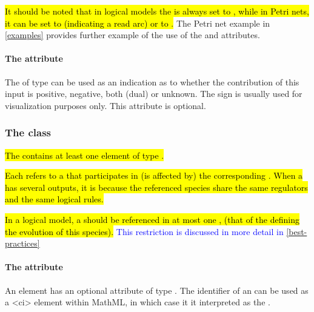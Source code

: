 \hl{It should be noted that in logical models the  is always set to , while in Petri nets, it can be set to  (indicating a read arc) or to . } The Petri net example in \ref{examples} provides further example of the use of the  and  attributes. 


 
\paragraph{The  attribute}
The  of type  can be used as an indication as to whether the contribution of this input is positive, negative, both (dual) or unknown. The sign is usually used for visualization purposes only. This attribute is optional.


\subsubsection{The  class}
\label{output-class}

\hl{The \ListOfOutputs contains at least one element of type \Output. }

\hl{Each \Output refers to a \QualitativeSpecies that participates in (is affected by) the corresponding \Transition. When a \Transition has several outputs, it is because the referenced species share the same regulators and the same logical rules.}


\hl{In a logical model, a \QualitativeSpecies should be referenced in at most one \ListOfOutputs, (that of the \Transition defining the evolution of this species). } \textcolor{blue}{This restriction is discussed in more detail in \ref{best-practices}}   


\paragraph{The  attribute}
An \Output element has an optional  attribute of type .  The identifier of an \Output can be used as a 
<ci> element within MathML, in which case it it interpreted as the .

